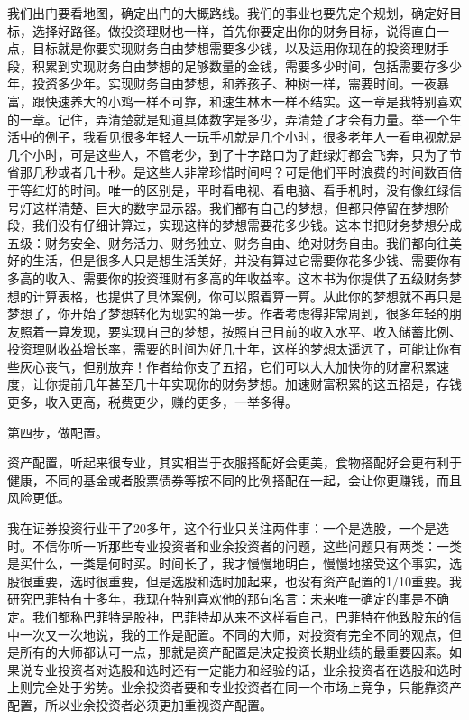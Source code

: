 我们出门要看地图，确定出门的大概路线。我们的事业也要先定个规划，确定好目标，选择好路径。做投资理财也一样，首先你要定出你的财务目标，说得直白一点，目标就是你要实现财务自由梦想需要多少钱，以及运用你现在的投资理财手段，积累到实现财务自由梦想的足够数量的金钱，需要多少时间，包括需要存多少年，投资多少年。实现财务自由梦想，和养孩子、种树一样，需要时间。一夜暴富，跟快速养大的小鸡一样不可靠，和速生林木一样不结实。这一章是我特别喜欢的一章。记住，弄清楚就是知道具体数字是多少，弄清楚了才会有力量。举一个生活中的例子，我看见很多年轻人一玩手机就是几个小时，很多老年人一看电视就是几个小时，可是这些人，不管老少，到了十字路口为了赶绿灯都会飞奔，只为了节省那几秒或者几十秒。是这些人非常珍惜时间吗？可是他们平时浪费的时间数百倍于等红灯的时间。唯一的区别是，平时看电视、看电脑、看手机时，没有像红绿信号灯这样清楚、巨大的数字显示器。我们都有自己的梦想，但都只停留在梦想阶段，我们没有仔细计算过，实现这样的梦想需要花多少钱。这本书把财务梦想分成五级：财务安全、财务活力、财务独立、财务自由、绝对财务自由。我们都向往美好的生活，但是很多人只是想生活美好，并没有算过它需要你花多少钱、需要你有多高的收入、需要你的投资理财有多高的年收益率。这本书为你提供了五级财务梦想的计算表格，也提供了具体案例，你可以照着算一算。从此你的梦想就不再只是梦想了，你开始了梦想转化为现实的第一步。作者考虑得非常周到，很多年轻的朋友照着一算发现，要实现自己的梦想，按照自己目前的收入水平、收入储蓄比例、投资理财收益增长率，需要的时间为好几十年，这样的梦想太遥远了，可能让你有些灰心丧气，但别放弃！作者给你支了五招，它们可以大大加快你的财富积累速度，让你提前几年甚至几十年实现你的财务梦想。加速财富积累的这五招是，存钱更多，收入更高，税费更少，赚的更多，一举多得。

第四步，做配置。

资产配置，听起来很专业，其实相当于衣服搭配好会更美，食物搭配好会更有利于健康，不同的基金或者股票债券等按不同的比例搭配在一起，会让你更赚钱，而且风险更低。

我在证券投资行业干了20多年，这个行业只关注两件事：一个是选股，一个是选时。不信你听一听那些专业投资者和业余投资者的问题，这些问题只有两类：一类是买什么，一类是何时买。时间长了，我才慢慢地明白，慢慢地接受这个事实，选股很重要，选时很重要，但是选股和选时加起来，也没有资产配置的1/10重要。我研究巴菲特有十多年，我现在特别喜欢他的那句名言：未来唯一确定的事是不确定。我们都称巴菲特是股神，巴菲特却从来不这样看自己，巴菲特在他致股东的信中一次又一次地说，我的工作是配置。不同的大师，对投资有完全不同的观点，但是所有的大师都认可一点，那就是资产配置是决定投资长期业绩的最重要因素。如果说专业投资者对选股和选时还有一定能力和经验的话，业余投资者在选股和选时上则完全处于劣势。业余投资者要和专业投资者在同一个市场上竞争，只能靠资产配置，所以业余投资者必须更加重视资产配置。

